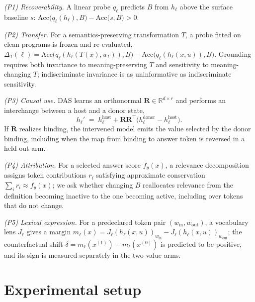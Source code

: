 \documentclass[10pt]{article}
\newcommand{\hb}{h_{\ell}}
\newcommand{\Rmat}{\mathbf{R}}
\newcommand{\Real}{\mathbb{R}}
\newcommand{\Bind}{B}
\newcommand{\acc}{\mathrm{Acc}}
\begin{document}
\emph{(P1) Recoverability.} A linear probe $q_\ell$ predicts $\Bind$ from $\hb$
above the surface baseline $s$:
$\acc\!\big(q_\ell(\hb),\Bind\big)-\acc\!\big(s,\Bind\big) > 0.$

\emph{(P2) Transfer.} For a semantics-preserving transformation $T$, a probe
fitted on clean programs is frozen and re-evaluated,
$\Delta_T(\ell)=\acc\!\big(q_\ell(\hb(T(x),u_T)),\Bind\big)-\acc\!\big(q_\ell(\hb(x,u)),\Bind\big).$
Grounding requires both invariance to meaning-preserving $T$ and sensitivity to
meaning-changing $T$; indiscriminate invariance is as uninformative as
indiscriminate sensitivity.

\emph{(P3) Causal use.} DAS learns an orthonormal $\Rmat\in\Real^{d\times r}$ and
performs an interchange between a host and a donor state,
\begin{equation}
\hb' \;=\; \hb^{\mathrm{host}} + \Rmat\Rmat^{\!\top}\!\big(\hb^{\mathrm{donor}}-\hb^{\mathrm{host}}\big).
\label{eq:interchange}
\end{equation}
If $\Rmat$ realizes binding, the intervened model emits the value selected by the
donor binding, including when the map from binding to answer token is reversed in
a held-out arm.

\emph{(P4) Attribution.} For a selected answer score $f_y(x)$, a relevance
decomposition assigns token contributions $r_i$ satisfying approximate
conservation $\sum_i r_i \approx f_y(x)$; we ask whether changing $\Bind$
reallocates relevance from the definition becoming inactive to the one becoming
active, including over tokens that do not change.

\emph{(P5) Lexical expression.} For a predeclared token pair
$(w_{\mathrm{in}},w_{\mathrm{out}})$, a vocabulary lens $J_\ell$ gives a margin
$m_\ell(x)=J_\ell(\hb(x,u))_{w_{\mathrm{in}}}-J_\ell(\hb(x,u))_{w_{\mathrm{out}}}$;
the counterfactual shift $\delta=m_\ell(x^{(1)})-m_\ell(x^{(0)})$ is predicted to
be positive, and its sign is measured separately in the two value arms.

\section{Experimental setup}
\label{sec:setup}
\end{document}
